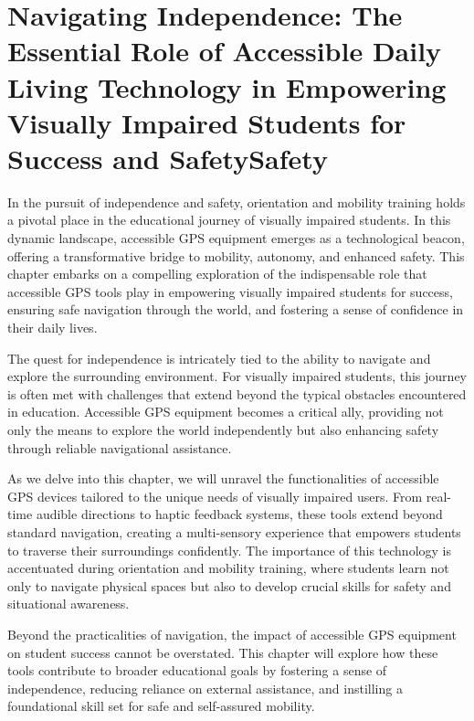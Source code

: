 \documentclass[12pt,letterpaper,twoside]{extreport}
\begin{document}
\cleardoublepage\hypertarget{accessible-gps-mapping}{}\chapter[\raggedright Navigating Independence: \\The Essential Role of Accessible Daily Living Technology in \\Empowering Visually Impaired Students for Success and Safety]{Navigating Independence: The Essential Role of Accessible Daily Living Technology in Empowering Visually Impaired Students for Success and SafetySafety}\label{accessible-gps-mapping}
\minitoc \newpage
{}
In the pursuit of independence and safety, orientation and mobility training holds a pivotal place in the educational journey of visually impaired students. In this dynamic landscape, accessible GPS equipment emerges as a technological beacon, offering a transformative bridge to mobility, autonomy, and enhanced safety. This chapter embarks on a compelling exploration of the indispensable role that accessible GPS tools play in empowering visually impaired students for success, ensuring safe navigation through the world, and fostering a sense of confidence in their daily lives.

The quest for independence is intricately tied to the ability to navigate and explore the surrounding environment. For visually impaired students, this journey is often met with challenges that extend beyond the typical obstacles encountered in education. Accessible GPS equipment becomes a critical ally, providing not only the means to explore the world independently but also enhancing safety through reliable navigational assistance.

As we delve into this chapter, we will unravel the functionalities of accessible GPS devices tailored to the unique needs of visually impaired users. From real-time audible directions to haptic feedback systems, these tools extend beyond standard navigation, creating a multi-sensory experience that empowers students to traverse their surroundings confidently. The importance of this technology is accentuated during orientation and mobility training, where students learn not only to navigate physical spaces but also to develop crucial skills for safety and situational awareness.

Beyond the practicalities of navigation, the impact of accessible GPS equipment on student success cannot be overstated. This chapter will explore how these tools contribute to broader educational goals by fostering a sense of independence, reducing reliance on external assistance, and instilling a foundational skill set for safe and self-assured mobility.
\end{document}
